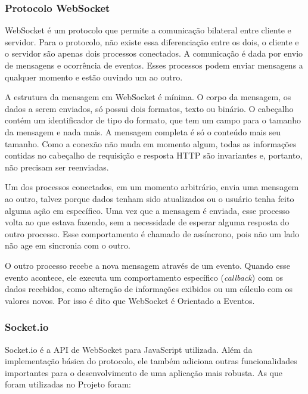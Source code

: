 \documentclass[a4paper,12pt]{article}
\begin{document}
\subsubsection{Protocolo WebSocket}

WebSocket é um protocolo que permite a comunicação bilateral entre cliente e servidor. Para o protocolo, não existe essa diferenciação entre os dois, o cliente e o servidor são apenas dois processos conectados. A comunicação é dada por envio de mensagens e ocorrência de eventos. Esses processos podem enviar mensagens a qualquer momento e estão ouvindo um ao outro.

A estrutura da mensagem em WebSocket é mínima. O corpo da mensagem, os dados a serem enviados, só possui dois formatos, texto ou binário. O cabeçalho contém um identificador de tipo do formato, que tem um campo para o tamanho da mensagem e nada mais. A mensagem completa é só o conteúdo mais seu tamanho. Como a conexão não muda em momento algum, todas as informações contidas no cabeçalho de requisição e resposta HTTP são invariantes e, portanto, não precisam ser reenviadas.

Um dos processos conectados, em um momento arbitrário, envia uma mensagem ao outro, talvez porque dados tenham sido atualizados ou o usuário tenha feito alguma ação em específico. Uma vez que a mensagem é enviada, esse processo volta ao que estava fazendo, sem a necessidade de esperar alguma resposta do outro processo. Esse comportamento é chamado de assíncrono, pois não um lado não age em sincronia com o outro.

O outro processo recebe a nova mensagem através de um evento. Quando esse evento acontece, ele executa um comportamento específico (\emph{callback}) com os dados recebidos, como alteração de informações exibidos ou um cálculo com os valores novos. Por isso é dito que WebSocket é Orientado a Eventos.


\subsubsection{Socket.io}

Socket.io é a API de WebSocket para JavaScript utilizada. Além da implementação básica do protocolo, ele também adiciona outras funcionalidades importantes para o desenvolvimento de uma aplicação mais robusta. As que foram utilizadas no Projeto foram:
\end{document}
